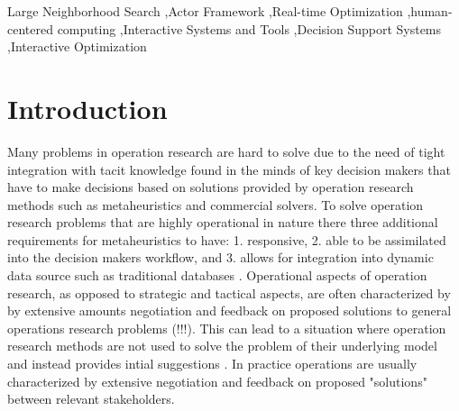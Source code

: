 \documentclass[preprint,12pt,authoryear]{elsarticle}
\begin{document}
\begin{frontmatter}
\begin{keyword}
Large Neighborhood Search \sep Actor Framework \sep Real-time Optimization \sep human-centered computing \sep Interactive Systems and Tools \sep Decision Support Systems \sep Interactive Optimization




\end{keyword}

\end{frontmatter}



\section{Introduction}
\label{sec:1-introduction}


Many problems in operation research are hard to solve due to the need of tight integration with tacit knowledge found in the minds of key decision makers 
that have to make decisions based on solutions provided by operation research methods such as metaheuristics and commercial solvers. 
To solve operation research problems that are highly operational in nature there three additional requirements for metaheuristics to have: 1.  
responsive, 2. able to be assimilated into the decision makers workflow, and 3. allows for integration into dynamic data source such as traditional databases \citep{meignan_review_2015}. 
Operational aspects of operation research, as opposed to strategic and tactical aspects, are often characterized by by extensive amounts negotiation and feedback on 
proposed solutions to general operations research problems (!!!). This can lead to a situation
where operation research methods are not used to solve the problem of their underlying model and instead provides intial suggestions \cite{meignan_review_2015}. In practice
operations are usually characterized by extensive negotiation and feedback on proposed "solutions" between relevant stakeholders.  
\end{document}

